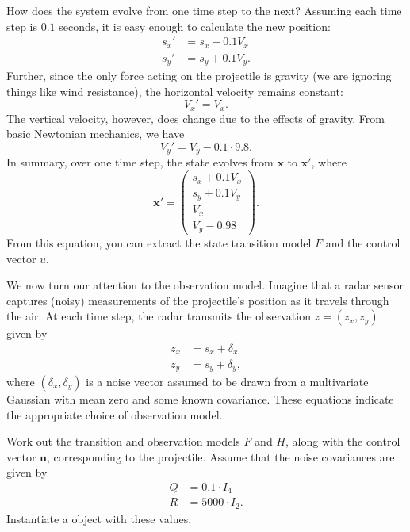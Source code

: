 How does the system evolve from one time step to the next?
Assuming each time step is $0.1$ seconds, it is easy enough to calculate the new position:
\begin{align*}
s_x' &= s_x + 0.1V_x\\
s_y' &= s_y + 0.1V_y.
\end{align*}
Further, since the only force acting on the projectile is gravity (we are ignoring things like wind resistance), the horizontal velocity remains constant:
\[
V_x' = V_x.
\]
The vertical velocity, however, does change due to the effects of gravity.
From basic Newtonian mechanics, we have
\[
V_y' = V_y - 0.1\cdot9.8.
\]
In summary, over one time step, the state evolves from $\mathbf{x}$ to $\mathbf{x}'$, where
\[
\mathbf{x}' = \left( \begin{array}{c} s_{x} + 0.1V_x \\ s_{y} + 0.1V_y \\ V_{x} \\ V_{y} - 0.98 \end{array} \right).
\]
From this equation, you can extract the state transition model $F$ and the control vector $u$.

We now turn our attention to the observation model.
Imagine that a radar sensor captures (noisy) measurements of the projectile's position as it travels through the air.
At each time step, the radar transmits the observation $z = (z_x, z_y)$ given by
\begin{align*}
z_x &= s_x + \delta_x\\
z_y &= s_y + \delta_y,
\end{align*}
where $(\delta_x, \delta_y)$ is a noise vector assumed to be drawn from a multivariate Gaussian with mean zero and some known covariance.
These equations indicate the appropriate choice of observation model.

\begin{problem}
Work out the transition and observation models $F$ and $H$, along with the control vector $\mathbf{u}$, corresponding to the projectile.
Assume that the noise covariances are given by
\begin{align*}
Q &= 0.1 \cdot I_4\\
R &= 5000 \cdot I_2.
\end{align*}
Instantiate a  object with these values.
\end{problem}

